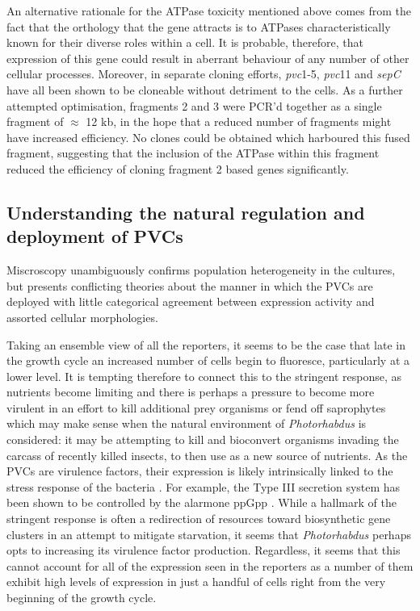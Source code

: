 An alternative rationale for the ATPase toxicity mentioned above comes from the fact that the orthology that the gene attracts is to ATPases characteristically known for their diverse roles within a cell. It is probable, therefore, that expression of this gene could result in aberrant behaviour of any number of other cellular processes. Moreover, in separate cloning efforts, \emph{pvc}1-5, \emph{pvc}11 and \emph{sepC} have all been shown to be cloneable without detriment to the cells. As a further attempted optimisation, fragments 2 and 3 were PCR'd together as a single fragment of $\approx$ 12 kb, in the hope that a reduced number of fragments might have increased efficiency. No clones could be obtained which harboured this fused fragment, suggesting that the inclusion of the ATPase within this fragment reduced the efficiency of cloning fragment 2 based genes significantly.

\subsection{Understanding the natural regulation and deployment of PVCs}

Miscroscopy unambiguously confirms population heterogeneity in the cultures, but presents conflicting theories about the manner in which the PVCs are deployed with little categorical agreement between expression activity and assorted cellular morphologies.

Taking an ensemble view of all the reporters, it seems to be the case that late in the growth cycle an increased number of cells begin to fluoresce, particularly at a lower level. It is tempting therefore to connect this to the stringent response, as nutrients become limiting and there is perhaps a pressure to become more virulent in an effort to kill additional prey organisms or fend off saprophytes which may make sense when the natural environment of \emph{Photorhabdus} is considered: it may be attempting to kill and bioconvert organisms invading the carcass of recently killed insects, to then use as a new source of nutrients. As the PVCs are virulence factors, their expression is likely intrinsically linked to the stress response of the bacteria \citep{Dalebroux2010,Chatnaparat2015}. For example, the Type III secretion system has been shown to be controlled by the alarmone ppGpp \citep{Ancona2015}. While a hallmark of the stringent response is often a redirection of resources toward biosynthetic gene clusters in an attempt to mitigate starvation, it seems that \emph{Photorhabdus} perhaps opts to increasing its virulence factor production. Regardless, it seems that this cannot account for all of the expression seen in the reporters as a number of them exhibit high levels of expression in just a handful of cells right from the very beginning of the growth cycle.

